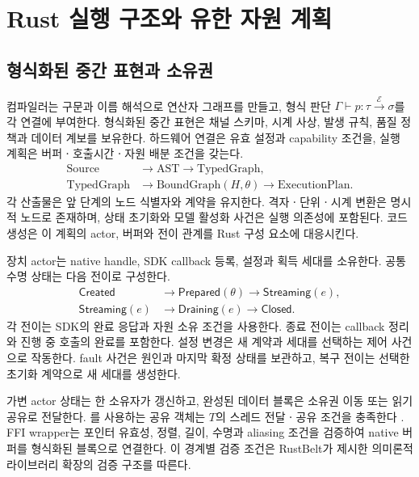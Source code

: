 \section{Rust 실행 구조와 유한 자원 계획}
\label{sec:runtime}

\subsection{형식화된 중간 표현과 소유권}

컴파일러는 구문과 이름 해석으로 연산자 그래프를 만들고,
형식 판단 $\Gamma\vdash p:\tau\xrightarrow{\mathcal E}\sigma$를 각 연결에 부여한다.
형식화된 중간 표현은 채널 스키마, 시계 사상, 발생 규칙,
품질 정책과 데이터 계보를 보유한다. 하드웨어 연결은 유효 설정과 capability 조건을,
실행 계획은 버퍼ㆍ호출시간ㆍ자원 배분 조건을 갖는다.
\begin{equation}
 \begin{aligned}
 \mathrm{Source}&\longrightarrow\mathrm{AST}
 \longrightarrow\mathrm{TypedGraph},\\
 \mathrm{TypedGraph}&\longrightarrow
        \mathrm{BoundGraph}(H,\theta)
 \longrightarrow\mathrm{ExecutionPlan}.
 \end{aligned}
 \label{eq:compiler-pipeline}
\end{equation}
각 산출물은 앞 단계의 노드 식별자와 계약을 유지한다.
격자ㆍ단위ㆍ시계 변환은 명시적 노드로 존재하며,
상태 초기화와 모델 활성화 사건은 실행 의존성에 포함된다.
코드 생성은 이 계획의 actor, 버퍼와 전이 관계를 Rust 구성 요소에 대응시킨다.

장치 actor는 native handle, SDK callback 등록, 설정과 획득 세대를 소유한다.
공통 수명 상태는 다음 전이로 구성한다.
\begin{equation}
 \begin{aligned}
 \mathsf{Created}&\longrightarrow\mathsf{Prepared}(\theta)
 \longrightarrow\mathsf{Streaming}(e),\\
 \mathsf{Streaming}(e)&\longrightarrow\mathsf{Draining}(e)
 \longrightarrow\mathsf{Closed}.
 \end{aligned}
 \label{eq:device-lifecycle}
\end{equation}
각 전이는 SDK의 완료 응답과 자원 소유 조건을 사용한다.
종료 전이는 callback 정리와 진행 중 호출의 완료를 포함한다.
설정 변경은 새 계약과 세대를 선택하는 제어 사건으로 작동한다.
fault 사건은 원인과 마지막 확정 상태를 보관하고,
복구 전이는 선택한 초기화 계약으로 새 세대를 생성한다.

가변 actor 상태는 한 소유자가 갱신하고,
완성된 데이터 블록은 소유권 이동 또는 읽기 공유로 전달한다.
를 사용하는 공유 객체는 $T$의 스레드 전달ㆍ공유 조건을 충족한다
\citep{rust_arc}. FFI wrapper는 포인터 유효성, 정렬, 길이, 수명과 aliasing 조건을
검증하여 native 버퍼를 형식화된 블록으로 연결한다\citep{rust_reference}.
이 경계별 검증 조건은 RustBelt가 제시한 의미론적 라이브러리 확장의
검증 구조를 따른다\citep{rustbelt}.

